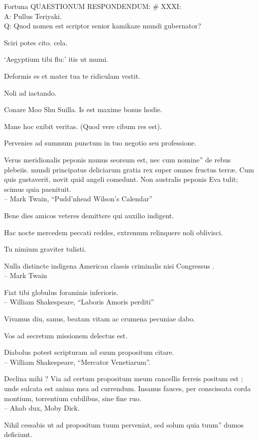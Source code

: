 \documentclass[titlepage,12pt]{memoir}
\begin{document}
Fortuna QUAESTIONUM RESPONDENDUM: \# XXXI:\\
A: Pullus Teriyaki.
\\Q: Quod nomen est scriptor senior kamikaze mundi gubernator?

Sciri potes cito. cela.

‘Aegyptium tibi flu:’ itis ut mumi.

Deformis es et mater tua te ridiculam vestit.

Noli ad iactando.

Conare Moo Shu Suilla. Is est maxime bonus hodie.

Mane hoc exibit veritas. (Quod vere cibum res est).

Pervenies ad summum punctum in tuo negotio seu professione.

Verus meridionalis peponis munus seorsum est, nec cum nomine”
de rebus plebeiis. mundi principatus deliciarum gratia rex
super omnes fructus terræ. Cum quis gustaverit, novit quid
angeli comedunt. Non australis peponis Eva tulit; scimus quia
paenituit.
\\-- Mark Twain, “Pudd’nhead Wilson’s Calendar”

Bene dies amicos veteres demittere qui auxilio indigent.

 Hac nocte mercedem peccati reddes, extremum relinquere noli oblivisci.

Tu nimium graviter tulisti.

Nulla distincte indigena American classis criminalis nisi Congressus .
\\-- Mark Twain

Fiat tibi globulus foraminis inferioris.
\\-- William Shakespeare, “Laboris Amoris perditi”

Vivamus diu, sanus, beatam vitam ac crumena pecuniae dabo.

Vos ad secretum missionem delectus est.

Diabolus potest scripturam ad suum propositum citare.
\\-- William Shakespeare, “Mercator Venetiarum”.

 Declina mihi ? Via ad certum propositum meum cancellis ferreis positum est ;
unde sulcata est anima mea ad currendum. Insanus fauces, per
conscissata corda montium, torrentium cubilibus, sine fine ruo.
\\-- Ahab dux, Moby Dick.

Nihil cessabis ut ad propositum tuum perveniat, sed solum quia tuum”
dumos deficiunt.
\end{document}
